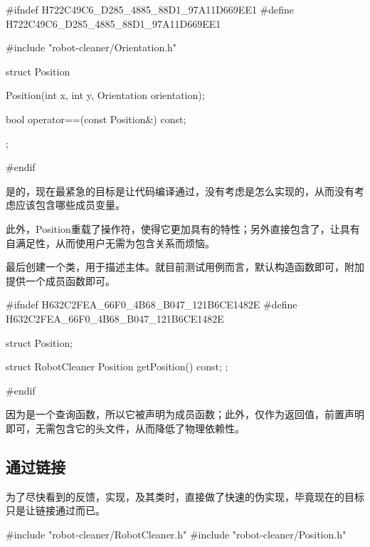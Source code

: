 \begin{content}
\begin{leftbar}
\begin{c++}[caption={include/robot-cleaner/Position.h}]
#ifndef H722C49C6_D285_4885_88D1_97A11D669EE1
#define H722C49C6_D285_4885_88D1_97A11D669EE1

#include "robot-cleaner/Orientation.h"

struct Position
{
    Position(int x, int y, Orientation orientation);

    bool operator==(const Position&) const;
};

#endif
\end{c++}
\end{leftbar}

是的，现在最紧急的目标是让代码编译通过，没有考虑是怎么实现的，从而没有考虑应该包含哪些成员变量。

此外，Position重载了操作符\ascii{==}，使得它更加具有的特性；另外直接包含了，让具有自满足性，从而使用户无需为包含关系而烦恼。

最后创建一个类，用于描述主体。就目前测试用例而言，默认构造函数即可，附加提供一个成员函数即可。

\begin{leftbar}
\begin{c++}[caption={include/robot-cleaner/RobotCleaner.h}]
#ifndef H632C2FEA_66F0_4B68_B047_121B6CE1482E
#define H632C2FEA_66F0_4B68_B047_121B6CE1482E

struct Position;

struct RobotCleaner
{
    Position getPosition() const;
};

#endif
\end{c++}
\end{leftbar}

因为是一个查询函数，所以它被声明为成员函数；此外，仅作为返回值，前置声明即可，无需包含它的头文件，从而降低了物理依赖性。

\subsection{通过链接}

为了尽快看到的反馈，实现，及其类时，直接做了快速的伪实现，毕竟现在的目标只是让链接通过而已。

\begin{leftbar}
\begin{c++}[caption={src/robot-cleaner/RobotCleaner.cpp}]
#include "robot-cleaner/RobotCleaner.h"
#include "robot-cleaner/Position.h"


\end{c++}
\end{leftbar}
\end{content}
